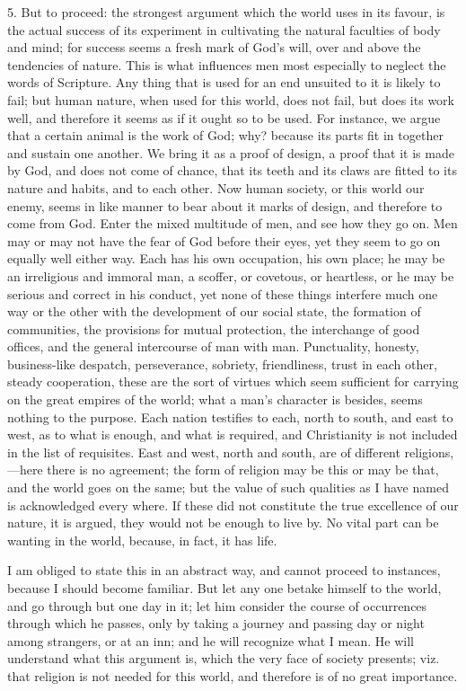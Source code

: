 5. But to proceed: the strongest argument which the world uses in
its favour, is the actual success of its experiment in cultivating the
natural faculties of body and mind; for success seems a fresh mark of
God's will, over and above the tendencies of nature. This is what
influences men most especially to neglect the words of Scripture. Any
thing that is used for an end unsuited to it is likely to fail; but
human nature, when used for this world, does not fail, but does its
work well, and therefore it seems as if it ought so to be used. For
instance, we argue that a certain animal is the work of God; why?
because its parts fit in together and sustain one another. We bring it
as a proof of design, a proof that it is made by God, and does not
come of chance, that its teeth and its claws are fitted to its nature
and habits, and to each other. Now human society, or this world our
enemy, seems in like manner to bear about it marks of design, and
therefore to come from God. Enter the mixed multitude of men, and see
how they go on. Men may or may not have the fear of God before their
eyes, yet they seem to go on equally well either way. Each has his
own
occupation, his own place; he may be an irreligious and immoral man, a
scoffer, or covetous, or heartless, or he may be serious and correct
in his conduct, yet none of these things interfere much one way or the
other with the development of our social state, the formation of
communities, the provisions for mutual protection, the interchange of
good offices, and the general intercourse of man with man.
Punctuality, honesty, business-like despatch, perseverance, sobriety,
friendliness, trust in each other, steady cooperation, these are the
sort of virtues which seem sufficient for carrying on the great
empires of the world; what a man's character is besides, seems nothing
to the purpose. Each nation testifies to each, north to south, and
east to west, as to what is enough, and what is required, and
Christianity is not included in the list of requisites. East and west,
north and south, are of different religions,—here there is no
agreement; the form of religion may be this or may be that, and the
world goes on the same; but the value of such qualities as I have
named is acknowledged every where. If these did not constitute the
true excellence of our nature, it is argued, they would not be enough
to live by. No vital part can be wanting in the world, because, in
fact, it has life.

I am obliged to state this in an abstract way, and cannot proceed
to instances, because I should become familiar. But let any one betake
himself to the world, and go through but one day in it; let him
consider the course of occurrences through which he passes, only by
taking a journey and passing day or night among strangers, or at an
inn; and he will recognize what I mean. He will understand what this
argument is, which the very face of society presents; viz. that
religion is not needed for this world, and therefore is of no great
importance.

